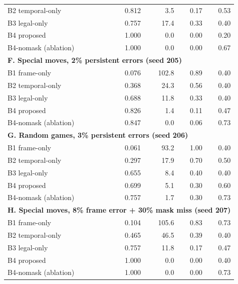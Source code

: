 \begin{longtable}{p{}rrrr}
B2 temporal-only & 0.812 & 3.5 & 0.17 & 0.53\\
B3 legal-only & 0.757 & 17.4 & 0.33 & 0.40\\
B4 proposed & 1.000 & 0.0 & 0.00 & 0.20\\
B4-nomask (ablation) & 1.000 & 0.0 & 0.00 & 0.67\\
\midrule
\multicolumn{5}{l}{\textbf{F. Special moves, 2\% persistent errors (seed 205)}}\\
B1 frame-only & 0.076 & 102.8 & 0.89 & 0.40\\
B2 temporal-only & 0.368 & 24.3 & 0.56 & 0.40\\
B3 legal-only & 0.688 & 11.8 & 0.33 & 0.40\\
B4 proposed & 0.826 & 1.4 & 0.11 & 0.47\\
B4-nomask (ablation) & 0.847 & 0.0 & 0.06 & 0.73\\
\midrule
\multicolumn{5}{l}{\textbf{G. Random games, 3\% persistent errors (seed 206)}}\\
B1 frame-only & 0.061 & 93.2 & 1.00 & 0.40\\
B2 temporal-only & 0.297 & 17.9 & 0.70 & 0.50\\
B3 legal-only & 0.655 & 8.4 & 0.40 & 0.40\\
B4 proposed & 0.699 & 5.1 & 0.30 & 0.60\\
B4-nomask (ablation) & 0.757 & 1.7 & 0.30 & 0.73\\
\midrule
\multicolumn{5}{l}{\textbf{H. Special moves, 8\% frame error + 30\% mask miss (seed 207)}}\\
B1 frame-only & 0.104 & 105.6 & 0.83 & 0.73\\
B2 temporal-only & 0.465 & 46.5 & 0.39 & 0.40\\
B3 legal-only & 0.757 & 11.8 & 0.17 & 0.47\\
B4 proposed & 1.000 & 0.0 & 0.00 & 0.40\\
B4-nomask (ablation) & 1.000 & 0.0 & 0.00 & 0.73\\
\midrule
\bottomrule
\end{longtable}
